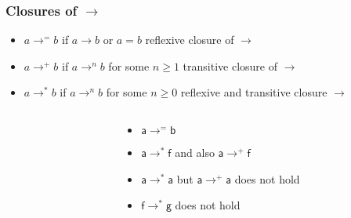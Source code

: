 \documentclass[12pt,aspectratio=169]{beamer}
\newcommand{\m}[1]{\mathsf{#1}}
\begin{document}
\begin{frame}
    \frametitle{Closures of $\rightarrow$}
    \begin{definition}
        \pause
        \begin{itemize}
            \item \alert{$a \rightarrow^{=} b$} if $a\rightarrow b$ or $a = b$ \hfill \alert{reflexive closure of $\rightarrow$}
            \pause \item \alert{$a \rightarrow^{+} b$} if $a\rightarrow^{n} b$ for some $n \geq 1$ \hfill \alert{transitive closure of $\rightarrow$}
            \pause \item \alert{$a \rightarrow^{*} b$} if $a\rightarrow^{n} b$ for some $n \geq 0$ \hfill \alert{reflexive and transitive closure $\rightarrow$}
        \end{itemize}
    \end{definition}
\pause
    \begin{example}
    \begin{columns}
        \begin{column}{0.35\textwidth}
            \centering
            \fig
        \end{column}
    \pause
        \begin{column}{0.5\textwidth}
            \begin{itemize}
                \item $\m{a} \rightarrow^{=} \m{b}$
                \pause \item $\m{a} \rightarrow^{*} \m{f}$ and also $\m{a} \rightarrow^{+} \m{f}$
                \pause \item $\m{a} \rightarrow^{*} \m{a}$ but $\m{a} \rightarrow^{+} \m{a}$ does not hold
                \pause \item $\m{f} \rightarrow^{*} \m{g}$ does not hold
            \end{itemize}
        \end{column}
        \end{columns}
    \end{example}
\end{frame}
\end{document}
